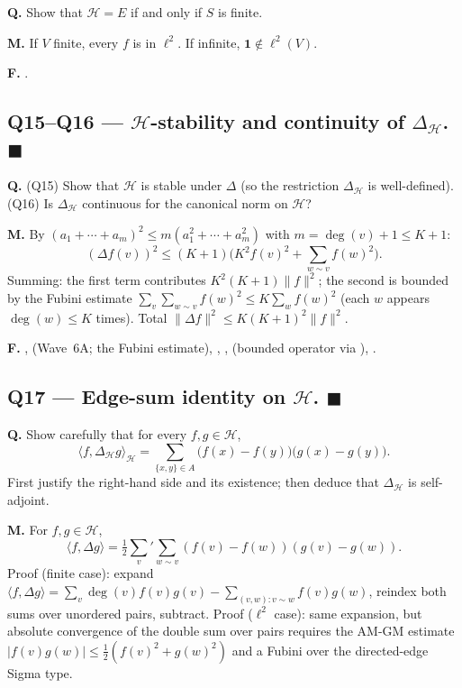 \documentclass[11pt,a4paper]{article}
\newcommand{\done}[1]{\textcolor{donegreen}{\textbf{#1}}}
\newcommand{\HH}{\mathcal{H}}
\renewcommand{\deg}{\operatorname{deg}}
\theoremstyle{plain}
\theoremstyle{definition}
\begin{document}
\textbf{Q.} Show that $\HH = E$ if and only if $S$ is finite.

\textbf{M.} If $V$ finite, every $f$ is in $\ell^2$. If infinite,
$\mathbf 1 \notin \ell^2(V)$.

\textbf{F.} .

\subsection{Q15--Q16 --- $\HH$-stability and continuity of $\Delta_\HH$. \done{$\blacksquare$}}

\textbf{Q.} (Q15) Show that $\HH$ is stable under $\Delta$ (so the
restriction $\Delta_\HH$ is well-defined). (Q16) Is $\Delta_\HH$
continuous for the canonical norm on $\HH$?

\textbf{M.} By $(a_1 + \cdots + a_m)^2 \leq m (a_1^2 + \cdots + a_m^2)$
with $m = \deg(v) + 1 \leq K + 1$:
\[
(\Delta f(v))^2 \leq (K+1)\bigl(K^2 f(v)^2 + \sum_{w \sim v} f(w)^2\bigr).
\]
Summing: the first term contributes $K^2(K+1) \|f\|^2$; the second
is bounded by the Fubini estimate $\sum_v \sum_{w \sim v} f(w)^2 \leq
K \sum_w f(w)^2$ (each $w$ appears $\deg(w) \leq K$ times). Total
$\|\Delta f\|^2 \leq K(K+1)^2 \|f\|^2$.

\textbf{F.} ,
 (Wave~6A; the Fubini estimate),
, ,
 (bounded operator via
), .

\subsection{Q17 --- Edge-sum identity on \texorpdfstring{$\HH$}{H}. \done{$\blacksquare$}}

\textbf{Q.} Show carefully that for every $f, g \in \HH$,
\[
\langle f, \Delta_\HH g \rangle_\HH
= \sum_{\{x, y\} \in A} \bigl(f(x) - f(y)\bigr)\bigl(g(x) - g(y)\bigr).
\]
First justify the right-hand side and its existence; then deduce
that $\Delta_\HH$ is self-adjoint.

\textbf{M.} For $f, g \in \HH$,
\[
\langle f, \Delta g\rangle = \tfrac12 \sum_v'\sum_{w \sim v}
(f(v) - f(w))(g(v) - g(w)).
\]
Proof (finite case): expand $\langle f, \Delta g\rangle = \sum_v
\deg(v) f(v) g(v) - \sum_{(v, w) : v \sim w} f(v) g(w)$, reindex both
sums over unordered pairs, subtract. Proof ($\ell^2$ case): same
expansion, but absolute convergence of the double sum over pairs
requires the AM-GM estimate $|f(v) g(w)| \leq \tfrac12(f(v)^2 + g(w)^2)$
and a Fubini over the directed-edge Sigma type.
\end{document}
